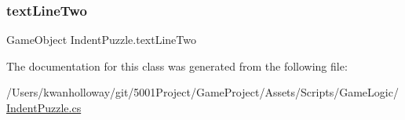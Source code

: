\mbox{\label{class_indent_puzzle_ad9cebfab9a44877b5bbed7549fcc08fd}} 
\subsubsection{\texorpdfstring{text\+Line\+Two}{textLineTwo}}
{\footnotesize\ttfamily Game\+Object Indent\+Puzzle.\+text\+Line\+Two}



The documentation for this class was generated from the following file\+:\begin{DoxyCompactItemize}
\item 
/\+Users/kwanholloway/git/5001\+Project/\+Game\+Project/\+Assets/\+Scripts/\+Game\+Logic/\hyperlink{_indent_puzzle_8cs}{Indent\+Puzzle.\+cs}\end{DoxyCompactItemize}
